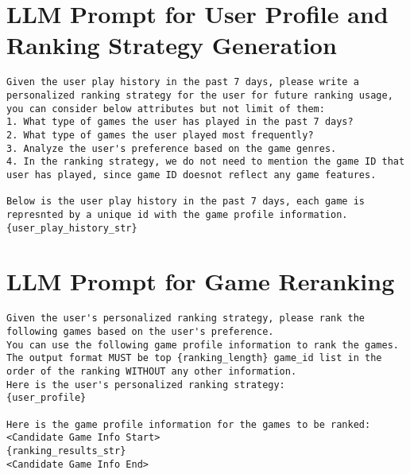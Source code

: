 \section{LLM Prompt for User Profile and Ranking Strategy Generation}
\label{sec:user_profile}
\begin{lstlisting}
Given the user play history in the past 7 days, please write a personalized ranking strategy for the user for future ranking usage, you can consider below attributes but not limit of them:
1. What type of games the user has played in the past 7 days?
2. What type of games the user played most frequently?
3. Analyze the user's preference based on the game genres.
4. In the ranking strategy, we do not need to mention the game ID that user has played, since game ID doesnot reflect any game features.

Below is the user play history in the past 7 days, each game is represnted by a unique id with the game profile information.
{user_play_history_str}
\end{lstlisting}

\section{LLM Prompt for Game Reranking}
\label{sec:game_reranking}
\begin{lstlisting}
Given the user's personalized ranking strategy, please rank the following games based on the user's preference.
You can use the following game profile information to rank the games.
The output format MUST be top {ranking_length} game_id list in the order of the ranking WITHOUT any other information.
Here is the user's personalized ranking strategy:
{user_profile}

Here is the game profile information for the games to be ranked:
<Candidate Game Info Start>
{ranking_results_str}
<Candidate Game Info End>
\end{lstlisting}